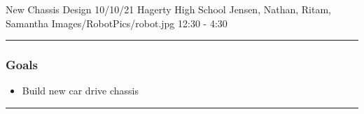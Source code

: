 \insertmeeting 
	{New Chassis Design} 
	{10/10/21}
	{Hagerty High School}
	{Jensen, Nathan, Ritam, Samantha}
	{Images/RobotPics/robot.jpg}
	{12:30 - 4:30}
	
\noindent\hfil\rule{\textwidth}{.4pt}\hfil
\subsubsection*{Goals}
\begin{itemize}
    \item Build new car drive chassis  

\end{itemize} 

\noindent\hfil\rule{\textwidth}{.4pt}\hfil

